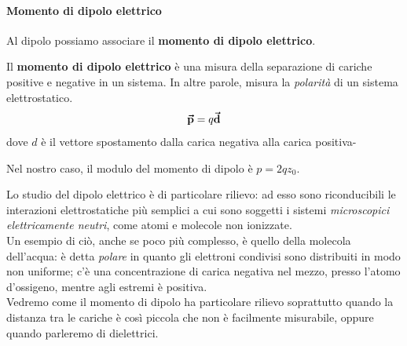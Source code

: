 \paragraph{Momento di dipolo elettrico}
Al dipolo possiamo associare il \textbf{momento di dipolo elettrico}.
\begin{define}
	Il \textbf{momento di dipolo elettrico} è una misura della separazione di cariche positive e negative in un sistema. In altre parole, misura la \textit{polarità} di un sistema elettrostatico.
	\begin{equation}
	\vb*{\va{p}}=q\vb*{\va{d}}
\end{equation}
dove $d$ è il vettore spostamento dalla carica negativa alla carica positiva-
\end{define}
Nel nostro caso, il modulo del momento di dipolo è $p=2qz_0$.
\begin{digression}
	Lo studio del dipolo elettrico è di particolare rilievo: ad esso sono riconducibili le interazioni elettrostatiche più semplici a cui sono soggetti i sistemi \textit{microscopici elettricamente neutri}, come atomi e molecole non ionizzate.\\
	Un esempio di ciò, anche se poco più complesso, è quello della molecola dell'acqua: è detta \textit{polare} in quanto gli elettroni condivisi sono distribuiti in modo non uniforme; c'è una concentrazione di carica negativa nel mezzo, presso l'atomo d'ossigeno, mentre agli estremi è positiva.\\
	Vedremo come il momento di dipolo ha particolare rilievo soprattutto quando la distanza tra le cariche è così piccola che non è facilmente misurabile, oppure quando parleremo di dielettrici.
\end{digression}
